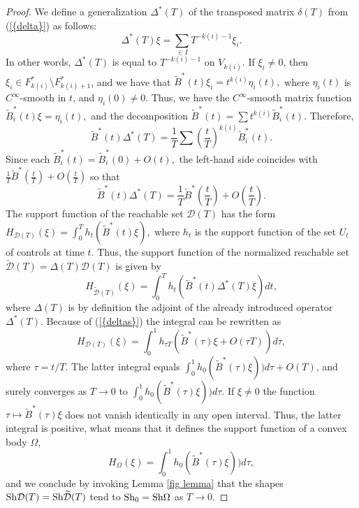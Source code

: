 \documentclass[final]{siamltex}
\begin{document}
\begin{proof}
We define a generalization $\Delta^*(T)$ of the transposed matrix $\delta(T)$ from {(\ref{{delta}})} as
follows:
$$\Delta^*(T)\xi=\sum_{\in I}T^{-k(i)-1}\xi_i.$$ In other words, $\Delta^*(T)$ is equal to $T^{-k(i)-1}$ on $V_{k(i)}$. If
$\xi_i\neq0$, then $\xi_i\in F_{k(i)}^*\setminus F_{k(i)+1}^*$, and we have that ${\widetilde
B}^*(t)\xi_i=t^{k(i)}\eta_i(t),$ where $\eta_i(t)$ is $C^\infty$-smooth in $t$, and
$\eta_i(0)\neq0.$ Thus, we have the $C^\infty$-smooth matrix function ${\widetilde
B}_i^*(t)\xi=\eta_i(t),$ and the decomposition ${\widetilde B}^*(t)=\sum t^{k(i)}{\widetilde
B}_i^*(t)$. Therefore, $${\widetilde B}^*(t)\Delta^*(T)=\frac1T\sum
\left(\frac{t}{T}\right)^{k(i)}{\widetilde B}_i^*(t).$$ Since each ${\widetilde
B}_i^*(t)={\widetilde B}_i^*(0)+O(t),$ the left-hand side coincides with $\frac1T{\widetilde
B}^*\left(\frac{t}{T}\right)+O\left(\frac{t}{T}\right)$ so that
\begin{equation}\label{deltas}
{\widetilde B}^*(t)\Delta^*(T)=\frac1T{\widetilde
B}^*\left(\frac{t}{T}\right)+O\left(\frac{t}{T}\right).
\end{equation}
The support function of the reachable set ${\mathcal D}(T)$ has the form $\displaystyle H_{{\mathcal
D}(T)}(\xi)=\int_0^T h_t({\widetilde B}^*(t)\xi),$ where $h_t$ is the support function of the set
$U_t$ of controls at time $t$. Thus, the support function of the normalized reachable set
$\widetilde{\mathcal D}(T)=\Delta(T){\mathcal D}(T)$ is given by
$$H_{\widetilde{\mathcal D}(T)}(\xi)=\int_0^T h_t({\widetilde B}^*(t)\Delta^*(T)\xi)dt,$$ where $\Delta(T)$ is by definition
the adjoint of the already introduced operator $\Delta^*(T)$. Because of {(\ref{{deltas}})} the integral
can be rewritten as
$$H_{{\mathcal
D}(T)}(\xi)=\int_0^1 h_{\tau T}({\widetilde B}^*(\tau)\xi+O(\tau T))d\tau,$$ where $\tau=t/T$. The
latter integral equals $\displaystyle \int_0^1 h_{0}({\widetilde B}^*(\tau)\xi))d\tau+O(T)$, and
surely converges as $T\to 0$ to $\displaystyle\int_0^1 h_{0}({\widetilde B}^*(\tau)\xi))d\tau$. If
$\xi\neq0$ the function $\tau\mapsto{\widetilde B}^*(\tau)\xi$ does not vanish identically in any
open interval. Thus, the latter integral is positive, what means that it defines the support
function of a convex body $\Omega$,
$$H_\Omega(\xi)=\int_0^1 h_{0}({\widetilde B}^*(\tau)\xi))d\tau,$$
 and we conclude by invoking Lemma \ref{fig lemma} that the shapes ${\mathop{\rm Sh}\nolimits} {\mathcal D}(T)={\mathop{\rm Sh}\nolimits}
\widetilde{\mathcal D}(T)$ tend to ${\mathop{\rm Sh}\nolimits}_0={\mathop{\rm Sh}\nolimits}\Omega$ as $T\to 0$.
\end{proof}
\fi
\end{document}
